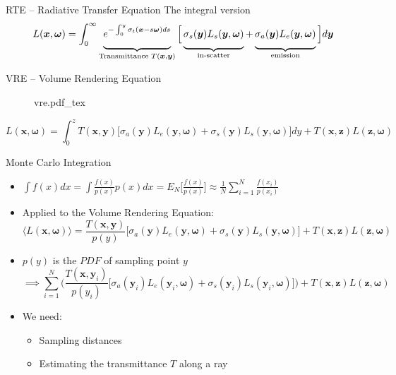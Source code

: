 \documentclass[
  english,            %
  aspectratio=169,    %
]{tumbeamer}
\newcommand\bx[0]{\bm{x}}
\newcommand\by[0]{\bm{y}}
\newcommand\bomega[0]{\bm{\omega}}
\newcommand*\mystrut[1]{\vrule width0pt height0pt depth#1\relax}
\newcommand{\incfig}[1]{%
    \def\svgwidth{\columnwidth}
    {#1.pdf_tex}
}
\begin{document}
\begin{frame}{RTE -- Radiative Transfer Equation}
    {The integral version}
    \vfill
    \vfill
    \begin{equation}
        L(\bx, \bomega) = \int_0^\infty 
        \underbrace{\mystrut{2ex}
            e^{-\int_0^y{\sigma_t(\bx-s\bomega)}ds}
        }_{\text{Transmittance } T(\bx, \by)}
        \Big[
            \underbrace{\mystrut{2ex}
                \sigma_s(\by)L_s(\by, \bomega)
            }_{\text{in-scatter}}
            + 
            \underbrace{\mystrut{2ex}
                \sigma_a(\by)L_e(\by, \bomega)
            }_{\text{emission}}
        \Big]
        d\by
    \end{equation}
    \vfill
\end{frame}

\begin{frame}{VRE -- Volume Rendering Equation}
    \begin{figure}[ht]
        \centering
        \incfig{vre}
        \label{fig:vre}
    \end{figure}
    \begin{equation}
    L(\bx, \bomega) = \int_{0}^{z} 
        T(\bx, \by)
        \big[ 
            \sigma_a(\by)L_e(\by, \bomega) + 
            \sigma_s(\by)L_s(\by, \bomega)
        \big] dy
        + 
        T(\bx, \textbf{z})L(\textbf{z},\bomega)
    \end{equation}
\end{frame}

\begin{frame}{Monte Carlo Integration}
\begin{itemize}
    \item $\int f(x)dx = \int \frac{f(x)}{p(x)}p(x) dx 
        = E_N\Big[ \frac{f(x)}{p(x)} \Big]
        \approx \frac{1}{N} \sum\limits_{i=1}^N \frac{f(x_i)}{p(x_i)}$
    \item Applied to the Volume Rendering Equation:
    $$\langle L(\bx, \bomega) \rangle = 
        \frac{T(\bx, \by)}{p(y)}
        \big[ 
            \sigma_a(\by)L_e(\by, \bomega) + 
            \sigma_s(\by)L_s(\by, \bomega)
        \big] 
        + 
        T(\bx, \textbf{z})L(\textbf{z},\bomega)$$
    \item $p(y)$ is the $PDF$ of sampling point $y$
        $$\implies
         \sum\limits_{i=1}^N \Big(
        \frac{T(\bx, \by_i)}{p(y_i)}
        \big[ 
            \sigma_a(\by_i)L_e(\by_i, \bomega) + 
            \sigma_s(\by_i)L_s(\by_i, \bomega)
        \big] \Big)
        + 
        T(\bx, \textbf{z})L(\textbf{z},\bomega)
        $$
    \item We need:
        \begin{itemize}
            \item Sampling distances
            \item Estimating the transmittance $T$ along a ray
        \end{itemize}
\end{itemize}
\end{frame}
\end{document}
